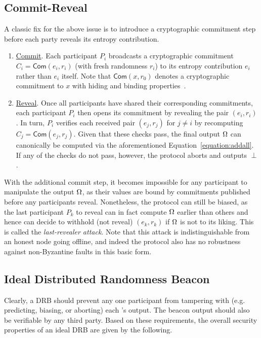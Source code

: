 \subsection{Commit-Reveal}
\label{subsection:commit-reveal}
A classic fix for the above issue is to introduce a cryptographic commitment step before each party reveals its entropy contribution.
\begin{enumerate}
\item \underline{Commit}. Each participant $P_i$ broadcasts a cryptographic commitment $C_i = \mathsf{Com}(e_i, r_i)$ (with fresh randomness $r_i$) to its entropy contribution $e_i$ rather than $e_i$ itself. Note that $\mathsf{Com}(x, r_0)$ denotes a cryptographic commitment to $x$ with hiding and binding properties~\cite{blum1983coin,damgaard1998commitment}.
\item \underline{Reveal}. Once all participants have shared their corresponding commitments, each participant $P_i$ then opens its commitment by revealing the pair $(e_i, r_i)$. In turn, $P_i$ verifies each received pair $(e_j, r_j)$ for $j \neq i$ by recomputing $C_j = \mathsf{Com}(e_j, r_j)$. Given that these checks pass, the final output $\Omega$ can canonically be computed via the aforementioned Equation~\ref{equation:addall}. If any of the checks do not pass, however, the protocol aborts and outputs $\perp$.
\end{enumerate}

With the additional commit step, it becomes impossible for any participant to manipulate the output $\Omega$, as their values are bound by commitments published before any participants reveal. Nonetheless, the protocol can still be biased, as the last participant $P_k$ to reveal can in fact compute $\Omega$ earlier than others and hence can decide to withhold (not reveal) $(e_k, r_k)$ if $\Omega$ is not to its liking. This is called the \textit{last-revealer attack}. Note that this attack is indistinguishable from an honest node going offline, and indeed the protocol also has no robustness against non-Byzantine faults in this basic form.

\subsection{Ideal Distributed Randomness Beacon}
Clearly, a DRB should prevent any one participant from tampering with (e.g. predicting, biasing, or aborting) each \epoch's output. The beacon output should also be verifiable by any third party. Based on these requirements, the overall security properties of an ideal DRB are given by the following.

